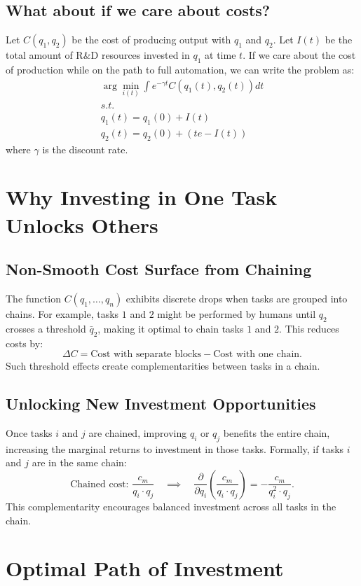 \documentclass{article}
\begin{document}
\subsection{What about if we care about costs?}
Let $C(q_1, q_2)$ be the cost of producing output with $q_1$ and $q_2$.
Let $I(t)$ be the total amount of R\&D resources invested in $q_1$ at time $t$.
If we care about the cost of production while on the path to full automation, we can write the problem as:
\begin{align}
\arg\min_{i(t)} \int e^{-\gamma t} C(q_1(t), q_2(t)) dt \\
s.t. \\
q_1(t) = q_1(0) + I(t) \\
q_2(t) = q_2(0) + (te - I(t))
\end{align}
where $\gamma$ is the discount rate.


\section{Why Investing in One Task Unlocks Others}

\subsection{Non-Smooth Cost Surface from Chaining}
The function $C(q_1, \dots, q_n)$ exhibits discrete drops when tasks are grouped into chains. For example, tasks $1$ and $2$ might be performed by humans until $q_2$ crosses a threshold $\bar{q}_2$, making it optimal to chain tasks $1$ and $2$. This reduces costs by:
\[
    \Delta C = \text{Cost with separate blocks} - \text{Cost with one chain}.
\]
Such threshold effects create complementarities between tasks in a chain.

\subsection{Unlocking New Investment Opportunities}
Once tasks $i$ and $j$ are chained, improving $q_i$ or $q_j$ benefits the entire chain, increasing the marginal returns to investment in those tasks. Formally, if tasks $i$ and $j$ are in the same chain:
\[
    \text{Chained cost: } \frac{c_m}{q_i \cdot q_j} \quad \implies \quad \frac{\partial}{\partial q_i} \left( \frac{c_m}{q_i \cdot q_j} \right) = -\frac{c_m}{q_i^2 \cdot q_j}.
\]
This complementarity encourages balanced investment across all tasks in the chain.

\section{Optimal Path of Investment}
\end{document}
